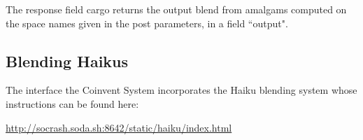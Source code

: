 The response field cargo returns the output blend from amalgams computed on the space names given in the post parameters, in a field ``output".


\subsection{Blending Haikus}

The interface the Coinvent System incorporates the Haiku blending system whose instructions can be found here:
\begin{center}
\url{http://socrash.soda.sh:8642/static/haiku/index.html}
\end{center}


